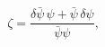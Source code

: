 \begin{equation}\label{eq:zeta2}
  \zeta=\frac{\delta\bar{\psi}\, \psi+\bar{\psi}\,\delta\psi}
  {\bar{\psi}\psi},
\end{equation}

